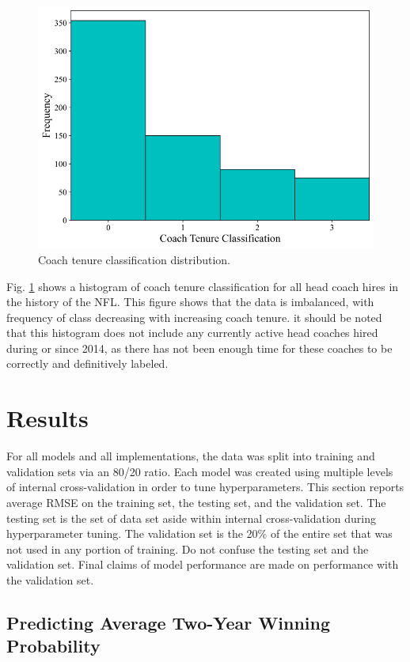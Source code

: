 \documentclass[conference]{IEEEtran}
\begin{document}
\begin{figure}[htbp]
\centerline{\includegraphics[width=1\linewidth]{hist2.png}}
\caption{Coach tenure classification distribution.}
\label{fig3}
\end{figure}

Fig. \ref{fig3} shows a histogram of coach tenure classification for all head coach hires in the history of the NFL. This figure shows that the data is imbalanced, with frequency of class decreasing with increasing coach tenure. it should be noted that this histogram does not include any currently active head coaches hired during or since 2014, as there has not been enough time for these coaches to be correctly and definitively labeled.

\section{Results}
For all models and all implementations, the data was split into training and validation sets via an 80/20 ratio. Each model was created using multiple levels of internal cross-validation in order to tune hyperparameters. This section reports average RMSE on the training set, the testing set, and the validation set. The testing set is the set of data set aside within internal cross-validation during hyperparameter tuning. The validation set is the 20\% of the entire set that was not used in any portion of training. Do not confuse the testing set and the validation set. Final claims of model performance are made on performance with the validation set.

\subsection{Predicting Average Two-Year Winning Probability}
\end{document}
